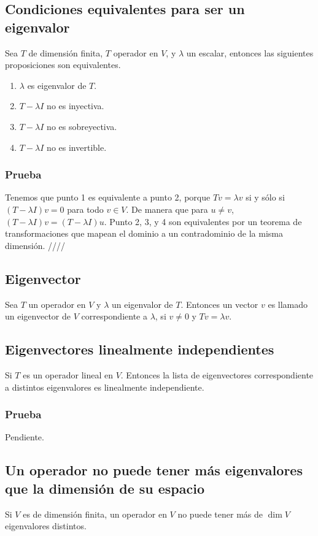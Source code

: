 \documentclass{article}
\begin{document}
\subsection{Condiciones equivalentes para ser un eigenvalor}
Sea $T$ de dimensión finita, $T$ operador en $V$, y
$\lambda$ un escalar, entonces las siguientes proposiciones
 son equivalentes.
 \begin{enumerate}
    \item $\lambda$ es eigenvalor de $T$.
    \item $T-\lambda I$ no es inyectiva.
    \item $T -\lambda I$ no es sobreyectiva.
    \item $T -\lambda I$ no es invertible.
 \end{enumerate}
 \subsubsection*{Prueba}
 Tenemos que punto 1 es equivalente a punto 2, porque
 $Tv=\lambda v$ si y sólo si $(T-\lambda I)v = 0$ para todo
 $v\in V$. De manera que para $u\neq v$, $(T-\lambda I)v =
 (T-\lambda I)u$. Punto 2, 3, y 4 son equivalentes por
 un teorema de transformaciones que mapean el dominio
 a un contradominio de la misma dimensión.
 \hfill ////

 \subsection{Eigenvector}
Sea $T$ un operador en $V$ y $\lambda$ un eigenvalor
de $T$. Entonces un vector $v$ es llamado un
eigenvector de $V$ correspondiente a $\lambda$, si
$v\neq 0$ y $Tv=\lambda v$.

\subsection{Eigenvectores linealmente independientes}
Si $T$ es un operador lineal en $V$. Entonces la lista
de eigenvectores correspondiente a distintos eigenvalores
es linealmente independiente.
\subsubsection*{Prueba}
Pendiente.

\subsection{Un operador no puede tener más eigenvalores que la dimensión de su espacio}
Si $V$ es de dimensión finita, un operador en $V$ no puede
tener más de $\dim V$ eigenvalores distintos. 
\end{document}
